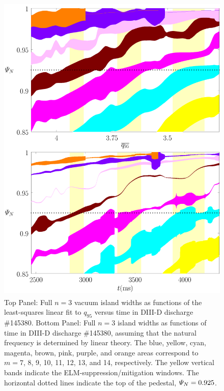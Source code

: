 \documentclass[12pt,prb,aps]{revtex4-1}
\begin{document}
\begin{figure}
\includegraphics[height=6in]{fig8.pdf}
\caption{Top Panel: Full  $n=3$ vacuum island widths as functions of the least-squares linear fit to $q_{95}$ versus time 
in   DIII-D discharge \#145380.
Bottom Panel:  Full $n=3$ island widths as functions of time
in   DIII-D discharge \#145380, assuming that the natural frequency is determined by linear theory. The blue, yellow, cyan, magenta, brown, pink,
purple, and orange  areas correspond to $m=7$, 8, 9, 10, 11, 12, 13, and 14, respectively. The yellow vertical bands indicate the ELM-suppression/mitigation windows. 
The horizontal dotted lines indicate the top of the pedestal, ${\mit\Psi}_N=0.925$.} \label{fig8}
\end{figure}
\end{document}
